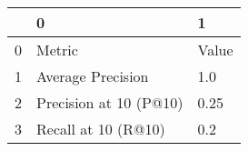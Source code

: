 \begin{tabular}{lll}
\toprule
{} &                       0 &      1 \\
\midrule
0 &                  Metric &  Value \\
1 &       Average Precision &    1.0 \\
2 &  Precision at 10 (P@10) &   0.25 \\
3 &     Recall at 10 (R@10) &    0.2 \\
\bottomrule
\end{tabular}
